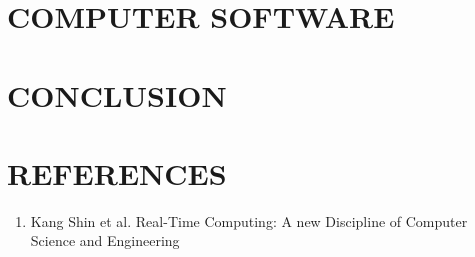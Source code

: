 \documentclass[letterpaper, 10 pt, conference]{IEEEconf}
\begin{document}
\section{COMPUTER SOFTWARE}

\section{CONCLUSION}

\section*{REFERENCES}

\begin{enumerate}
\item Kang Shin et al. Real-Time Computing: A new Discipline of Computer Science and Engineering
\end{enumerate}

\end{document}
